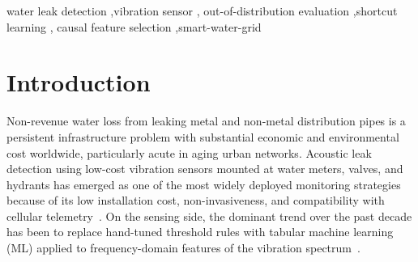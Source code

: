 \documentclass[3p,times,authoryear]{elsarticle}
\theoremstyle{remark}
\begin{document}
\begin{frontmatter}
\begin{abstract}
training, and maximum-mean-discrepancy generalisation).
(iv)~A multi-seed deployment recipe: a tree-only soft average of
flat and hierarchical XGBoost on 57 causal features attains OOD
macro-F1 \textbf{0.4326} with perfect normal-class recall; the
strongest deep alternative (an MLP trained with group
distributionally robust optimisation, GroupDRO) reaches only
$0.358 \pm
0.013$ across five seeds. The audit protocol is independently
re-applied to nine external public sensor benchmarks
(UCI~SECOM~\cite{mccann2008secom},
UCI~HAR~\cite{anguita2013har}, and the seven machines of
MIMII-DG~\cite{dohi2022mimii}) and shown to discriminate
shortcut-laden from clean
benchmarks rather than blanket-flagging vibration data. The
full audit protocol, multi-seed harness, and deployment recipe
are released for reproducibility.
\end{abstract}

\begin{keyword}
water leak detection \sep vibration sensor \sep
out-of-distribution evaluation \sep shortcut learning \sep
causal feature selection \sep smart-water-grid
\end{keyword}

\end{frontmatter}

\section{Introduction}\label{sec:intro}

Non-revenue water loss from leaking metal and non-metal
distribution pipes is a persistent infrastructure problem with
substantial economic and environmental cost worldwide, particularly
acute in aging urban networks. Acoustic leak detection using
low-cost vibration sensors mounted at water meters, valves, and
hydrants has emerged as one of the most widely deployed monitoring
strategies because of its low installation cost,
non-invasiveness, and compatibility with cellular
telemetry~\cite{hunaidi2000plastic,ismail2019review}.
On the sensing side, the dominant trend over the past decade has
been to replace hand-tuned threshold rules with tabular machine
learning (ML) applied to frequency-domain features of the
vibration spectrum~\cite{shukla2020leakage,fereidooni2021hybrid,
cody2020leak,liu2019leakage}.
\end{document}
